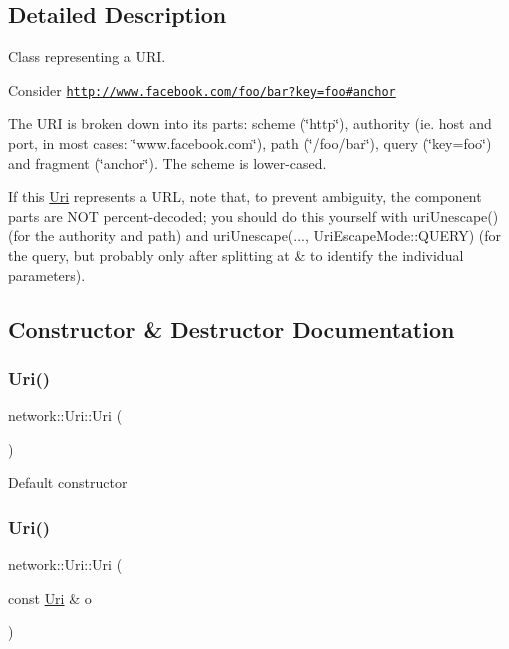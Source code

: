 \subsection{Detailed Description}
Class representing a U\+RI.

Consider \href{http://www.facebook.com/foo/bar?key=foo#anchor}{\tt http\+://www.\+facebook.\+com/foo/bar?key=foo\#anchor}

The U\+RI is broken down into its parts\+: scheme (\char`\"{}http\char`\"{}), authority (ie. host and port, in most cases\+: \char`\"{}www.\+facebook.\+com\char`\"{}), path (\char`\"{}/foo/bar\char`\"{}), query (\char`\"{}key=foo\char`\"{}) and fragment (\char`\"{}anchor\char`\"{}). The scheme is lower-\/cased.

If this \hyperlink{classnetwork_1_1Uri}{Uri} represents a U\+RL, note that, to prevent ambiguity, the component parts are N\+OT percent-\/decoded; you should do this yourself with uri\+Unescape() (for the authority and path) and uri\+Unescape(..., Uri\+Escape\+Mode\+::\+Q\+U\+E\+RY) (for the query, but probably only after splitting at \textquotesingle{}\&\textquotesingle{} to identify the individual parameters). 

\subsection{Constructor \& Destructor Documentation}
\mbox{\label{classnetwork_1_1Uri_a09bf538373af150b9a766ab0b4773b73}} 
\subsubsection{\texorpdfstring{Uri()}{Uri()}\hspace{0.1cm}{\footnotesize\ttfamily [1/3]}}
{\footnotesize\ttfamily network\+::\+Uri\+::\+Uri (\begin{DoxyParamCaption}{ }\end{DoxyParamCaption})}

Default constructor \mbox{\label{classnetwork_1_1Uri_a6895784a1ca3d1b1ebe88767f19bf980}} 
\subsubsection{\texorpdfstring{Uri()}{Uri()}\hspace{0.1cm}{\footnotesize\ttfamily [2/3]}}
{\footnotesize\ttfamily network\+::\+Uri\+::\+Uri (\begin{DoxyParamCaption}\item[{const \hyperlink{classnetwork_1_1Uri}{Uri} \&}]{o }\end{DoxyParamCaption})}

